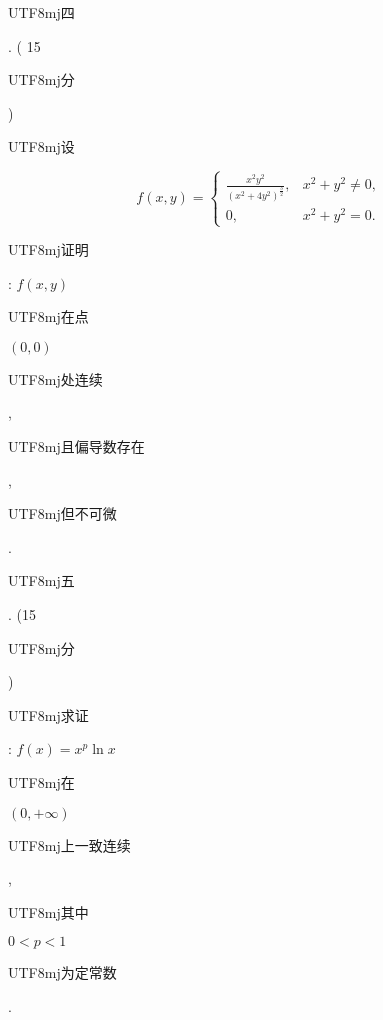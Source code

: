\documentclass[10pt]{article}
\begin{document}
\begin{CJK}{UTF8}{mj}四\end{CJK}. ( 15 \begin{CJK}{UTF8}{mj}分\end{CJK}) \begin{CJK}{UTF8}{mj}设\end{CJK}
$$
f(x, y)= \begin{cases}\frac{x^{2} y^{2}}{\left(x^{2}+4 y^{2}\right)^{\frac{3}{2}}}, & x^{2}+y^{2} \neq 0, \\ 0, & x^{2}+y^{2}=0 .\end{cases}
$$
\begin{CJK}{UTF8}{mj}证明\end{CJK}: $f(x, y)$ \begin{CJK}{UTF8}{mj}在点\end{CJK} $(0,0)$ \begin{CJK}{UTF8}{mj}处连续\end{CJK}, \begin{CJK}{UTF8}{mj}且偏导数存在\end{CJK}, \begin{CJK}{UTF8}{mj}但不可微\end{CJK}.

\begin{CJK}{UTF8}{mj}五\end{CJK}. (15 \begin{CJK}{UTF8}{mj}分\end{CJK}) \begin{CJK}{UTF8}{mj}求证\end{CJK}: $f(x)=x^{p} \ln x$ \begin{CJK}{UTF8}{mj}在\end{CJK} $(0,+\infty)$ \begin{CJK}{UTF8}{mj}上一致连续\end{CJK}, \begin{CJK}{UTF8}{mj}其中\end{CJK} $0<p<1$ \begin{CJK}{UTF8}{mj}为定常数\end{CJK}.
\end{document}

